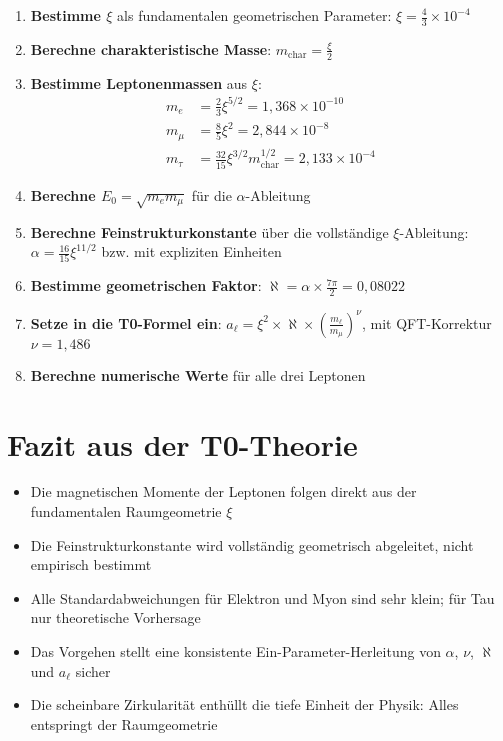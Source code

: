 \documentclass[12pt,a4paper]{article}
\newcommand{\xipar}{\xi}
\newcommand{\nulep}{\nu}
\newcommand{\mchar}{m_{\text{char}}}
\newcommand{\Ezero}{E_0}
\begin{document}
	\begin{enumerate}
		\item \textbf{Bestimme $\xipar$} als fundamentalen geometrischen Parameter: $\xipar = \frac{4}{3} \times 10^{-4}$
		\item \textbf{Berechne charakteristische Masse}: $\mchar = \frac{\xipar}{2}$
		\item \textbf{Bestimme Leptonenmassen} aus $\xipar$:
		\begin{align}
			m_e &= \frac{2}{3} \xipar^{5/2} = 1{,}368 \times 10^{-10} \\
			m_\mu &= \frac{8}{5} \xipar^2 = 2{,}844 \times 10^{-8} \\
			m_\tau &= \frac{32}{15} \xipar^{3/2} \mchar^{1/2} = 2{,}133 \times 10^{-4}
		\end{align}
		\item \textbf{Berechne $\Ezero = \sqrt{m_e m_\mu}$} für die $\alpha$-Ableitung
		\item \textbf{Berechne Feinstrukturkonstante} über die vollständige $\xipar$-Ableitung: $\alpha = \frac{16}{15} \xipar^{11/2}$ bzw. mit expliziten Einheiten
		\item \textbf{Bestimme geometrischen Faktor}: $\aleph = \alpha \times \frac{7\pi}{2} = 0{,}08022$
		\item \textbf{Setze in die T0-Formel ein}: $a_\ell = \xipar^2 \times \aleph \times \left(\frac{m_\ell}{m_\mu}\right)^\nulep$, mit QFT-Korrektur $\nulep = 1{,}486$
		\item \textbf{Berechne numerische Werte} für alle drei Leptonen
	\end{enumerate}
	
	\section{Fazit aus der T0-Theorie}
	
	\begin{itemize}
		\item Die magnetischen Momente der Leptonen folgen direkt aus der fundamentalen Raumgeometrie $\xipar$
		\item Die Feinstrukturkonstante wird vollständig geometrisch abgeleitet, nicht empirisch bestimmt
		\item Alle Standardabweichungen für Elektron und Myon sind sehr klein; für Tau nur theoretische Vorhersage
		\item Das Vorgehen stellt eine konsistente Ein-Parameter-Herleitung von $\alpha$, $\nulep$, $\aleph$ und $a_\ell$ sicher
		\item Die scheinbare Zirkularität enthüllt die tiefe Einheit der Physik: Alles entspringt der Raumgeometrie
	\end{itemize}
	
\end{document}
